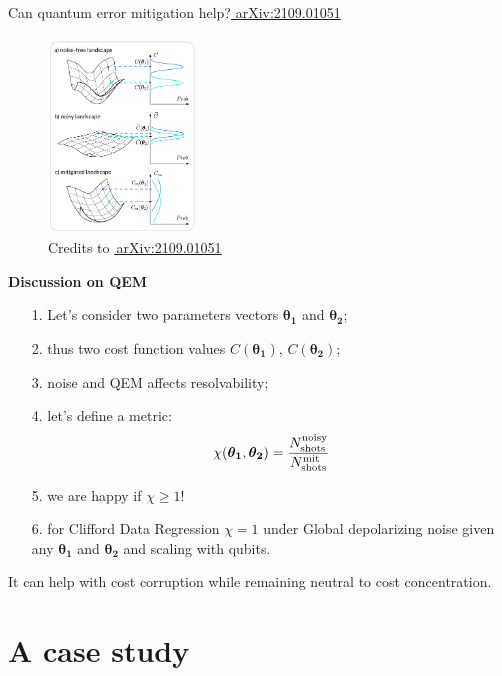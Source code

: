 \documentclass[8pt, xcolor={svgnames}, hyperref={linkcolor=black}, aspectratio=169]{beamer}
\begin{document}
\begin{frame}{Can quantum error mitigation help?\hfill \href{https://arxiv.org/abs/2109.01051}{\faBook\,\,arXiv:2109.01051}}
\begin{multicols}{2}
\begin{figure}
    \includegraphics[width=0.35\textwidth, height=0.8\textheight]{figures/NIBP_cropped.pdf}
    \caption*{Credits to \href{https://arxiv.org/abs/2109.01051}{\faBook\,arXiv:2109.01051}}
\end{figure}
\pause
\textbf{Discussion on QEM}
\pause
\begin{itemize}[noitemsep]
\item[1.] Let's consider two parameters vectors $\bm{\theta_1}$ and $\bm{\theta_2}$;
\item[2.] thus two cost function values $C(\bm{\theta_1})$, $C(\bm{\theta_2})$;
\item[3.] noise and QEM affects resolvability;
\pause
\item[4.] let's define a metric: 
\vspace{-0.2cm}
$$ \chi(\bm{\theta_1}, \bm{\theta_2}) = \frac{N_{\rm shots}^{\rm noisy}}{N_{\rm shots}^{\rm mit}}$$
\vspace{-0.5cm}
\item[5.] we are happy if $\chi \geq 1$!
\pause
\item[6.] for Clifford Data Regression $\chi=1$ under Global depolarizing noise given 
any $\bm{\theta_1}$ and $\bm{\theta_2}$ and scaling with qubits.
\end{itemize}
\begin{tcolorbox}[colback=blue!20, title=Good news!]
It can help with cost corruption while remaining neutral to cost concentration.
\end{tcolorbox}
\end{multicols}
\end{frame}


\section{A case study}
\end{document}
